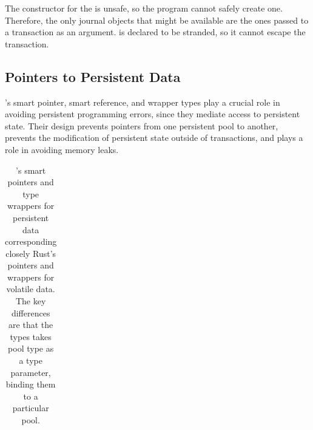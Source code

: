 \begin{discuss}
  The constructor for the  is unsafe, so the program cannot
  safely create one.  Therefore, the only journal objects that might be
  available are the ones passed to a transaction as an argument.
   is declared to be stranded, so it cannot escape the transaction.
  
\end{discuss}


\subsection{Pointers to Persistent Data}

\This{}'s smart pointer, smart reference, and wrapper types play a crucial role
in avoiding persistent programming errors, since they mediate access to
persistent state.  Their design prevents pointers from one persistent pool to
another, prevents the modification of persistent state outside of transactions,
and plays a role in avoiding memory leaks.

\begin{table}
{ \centering
  \footnotesize
  \begin{tabular}{|l|l|p{4in}|}\hline
    
  \end{tabular}}
  \caption{\This{}'s smart pointers and type wrappers for persistent data
    corresponding closely Rust's pointers and wrappers for volatile data.  The
    key differences are that the \this{} types takes pool type as a type
    parameter, binding them to a particular pool.}
  \label{tab:types}
\end{table}


